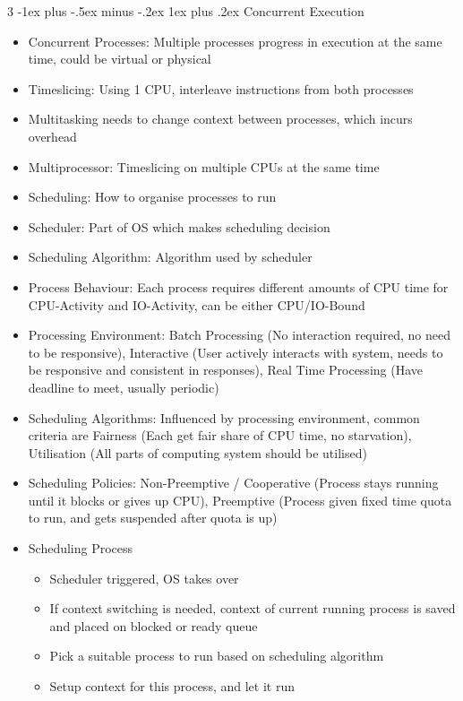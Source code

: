 \documentclass[10pt, landscape]{article}
\makeatletter
\renewcommand{\subsection}{\@startsection{subsection}{3}{0mm}%
                                {-1ex plus -.5ex minus -.2ex}%
                                {1ex plus .2ex}%
                                {\normalfont\small\bfseries}}%
\makeatother
\begin{document}
\begin{multicols*}{3}
\subsection{Concurrent Execution}
\begin{itemize}
    \item Concurrent Processes: Multiple processes progress in execution at the same time, could be virtual or physical
    \item Timeslicing: Using 1 CPU, interleave instructions from both processes
    \item Multitasking needs to change context between processes, which incurs overhead
    \item Multiprocessor: Timeslicing on multiple CPUs at the same time
    \item Scheduling: How to organise processes to run
    \item Scheduler: Part of OS which makes scheduling decision
    \item Scheduling Algorithm: Algorithm used by scheduler
    \item Process Behaviour: Each process requires different amounts of CPU time for CPU-Activity and IO-Activity, can be either CPU/IO-Bound
    \item Processing Environment: Batch Processing (No interaction required, no need to be responsive), Interactive (User actively interacts with system, needs to be responsive and consistent in responses), Real Time Processing (Have deadline to meet, usually periodic)
    \item Scheduling Algorithms: Influenced by processing environment, common criteria are Fairness (Each get fair share of CPU time, no starvation), Utilisation (All parts of computing system should be utilised)
    \item Scheduling Policies: Non-Preemptive / Cooperative (Process stays running until it blocks or gives up CPU), Preemptive (Process given fixed time quota to run, and gets suspended after quota is up)
    \item Scheduling Process
    \begin{itemize}
        \item Scheduler triggered, OS takes over
        \item If context switching is needed, context of current running process is saved and placed on blocked or ready queue
        \item Pick a suitable process to run based on scheduling algorithm
        \item Setup context for this process, and let it run
    \end{itemize}
\end{itemize}


\end{multicols*}
\end{document}
